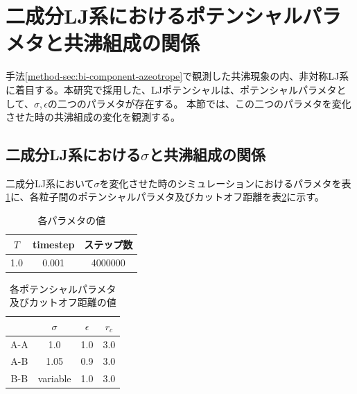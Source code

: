 \documentclass[titlepage]{jsreport}
\begin{document}
\section{二成分LJ系におけるポテンシャルパラメタと共沸組成の関係} \label{method-sec:bi-component-potential-parameter-azeotrope-ratio}
手法\ref{method-sec:bi-component-azeotrope}で観測した共沸現象の内、非対称LJ系に着目する。本研究で採用した、LJポテンシャルは、ポテンシャルパラメタとして、${\sigma}$,\,${\epsilon}$の二つのパラメタが存在する。
本節では、この二つのパラメタを変化させた時の共沸組成の変化を観測する。


\subsection{二成分LJ系における$\sigma$と共沸組成の関係} \label{method-subsec:bi-component-sigma-azeotrope-ratio}
二成分LJ系において${\sigma}$を変化させた時のシミュレーションにおけるパラメタを表\ref{table:bi-component-sigma-azeotrope-ratio-parameter}に、各粒子間のポテンシャルパラメタ及びカットオフ距離を表\ref{table:bi-component-sigma-azeotrope-ratio-potential-parameter}に示す。

\begin{table}[htbp]
    \begin{center}
        \caption{各パラメタの値}
        \label{table:bi-component-sigma-azeotrope-ratio-parameter}
        \begin{tabular}{c c c}
            $T$ & timestep & ステップ数 \\
            \hline
            1.0 & 0.001 & 4000000 \\
        \end{tabular}
    \end{center}
\end{table}

\begin{table}[htbp]
    \begin{center}
        \caption{各ポテンシャルパラメタ及びカットオフ距離の値}
        \label{table:bi-component-sigma-azeotrope-ratio-potential-parameter}
        \begin{tabular}{c c c c}
            & $\sigma$ & $\epsilon$ & $r_c$ \\
            \hline
            A-A & 1.0 & 1.0 & 3.0 \\
            A-B & 1.05 & 0.9 & 3.0 \\
            B-B & variable & 1.0 & 3.0
        \end{tabular}
    \end{center}
\end{table}
\end{document}
